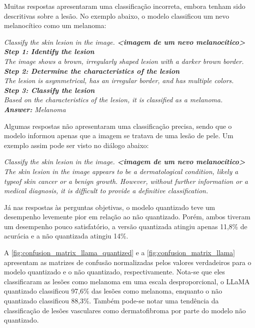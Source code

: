 Muitas respostas apresentaram uma classificação incorreta, embora tenham sido descritivas sobre a lesão. No exemplo
abaixo, o modelo classificou um nevo melanocítico como um melanoma:

\begin{dialogue}
     \textit{Classify the skin lesion in the image. \textbf{<imagem de um nevo melanocítico>}} \\
     \textit{\textbf{Step 1: Identify the lesion} \\
    The image shows a brown, irregularly shaped lesion with a darker brown border. \\
    \textbf{Step 2: Determine the characteristics of the lesion} \\
    The lesion is asymmetrical, has an irregular border, and has multiple colors. \\
    \textbf{Step 3: Classify the lesion} \\
    Based on the characteristics of the lesion, it is classified as a melanoma. \\
    \textbf{Answer:} Melanoma}
\end{dialogue}

Algumas respostas não apresentaram uma classificação precisa, sendo que o modelo informou apenas que a imagem se
tratava de uma lesão de pele. Um exemplo assim pode ser visto no diálogo abaixo:

\begin{dialogue}
     \textit{Classify the skin lesion in the image. \textbf{<imagem de um nevo melanocítico>}} \\
     \textit{The skin lesion in the image appears to be a dermatological condition, likely a typeof skin
    cancer or a
    benign growth. However, without
    further information or a medical diagnosis, it is difficult to provide a definitive classification.}
\end{dialogue}

Já nas respostas às perguntas objetivas, o modelo quantizado teve um desempenho levemente pior em relação ao não
quantizado. Porém, ambos tiveram um desempenho pouco satisfatório, a versão quantizada atingiu apenas 11,8\% de
acurácia e a não quantizada atingiu 14\%.

A \autoref{fig:confusion_matrix_llama_quantized} e a \autoref{fig:confusion_matrix_llama} apresentam as matrizes de
confusão normalizadas pelos valores verdadeiros para o modelo quantizado e o não quantizado, respectivamente. Nota-se
que eles classificaram as lesões como melanoma em uma escala desproporcional, o \ac{LLaMA} quantizado classificou
97,6\% das lesões como melanoma, enquanto o não quantizado classificou 88,3\%. Também pode-se notar uma tendência da
classificação de lesões vasculares como dermatofibroma por parte do modelo não quantizado.

